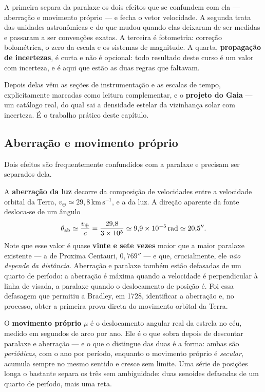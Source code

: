 \documentclass[11pt,a4paper]{article}
\begin{document}
A primeira separa da paralaxe os dois efeitos que se confundem com ela --- aberração e movimento próprio --- e fecha o vetor velocidade. A segunda trata das unidades astronômicas e do que mudou quando elas deixaram de ser medidas e passaram a ser convenções exatas. A terceira é fotometria: correção bolométrica, o zero da escala e os sistemas de magnitude. A quarta, \textbf{propagação de incertezas}, é curta e não é opcional: todo resultado deste curso é um valor com incerteza, e é aqui que estão as duas regras que faltavam.

Depois delas vêm as seções de instrumentação e as escalas de tempo, explicitamente marcadas como leitura complementar, e o \textbf{projeto do Gaia} --- um catálogo real, do qual sai a densidade estelar da vizinhança solar com incerteza. É o trabalho prático deste capítulo.

\subsection*{Aberração e movimento próprio}

Dois efeitos são frequentemente confundidos com a paralaxe e precisam ser separados dela.

A \textbf{aberração da luz} decorre da composição de velocidades entre a velocidade orbital da Terra, $v_\oplus\simeq29{,}8\,\mathrm{km\,s^{-1}}$, e a da luz. A direção aparente da fonte desloca-se de um ângulo
\[
\theta_{\rm ab}\simeq\frac{v_\oplus}{c}=\frac{29{,}8}{3\times10^{5}}\simeq9{,}9\times10^{-5}\,\mathrm{rad}\simeq20{,}5''.
\]
Note que esse valor é quase \textbf{vinte e sete vezes} maior que a maior paralaxe existente --- a de Proxima Centauri, $0{,}769''$ --- e que, crucialmente, ele \emph{não depende da distância}. Aberração e paralaxe também estão defasadas de um quarto de período: a aberração é máxima quando a velocidade é perpendicular à linha de visada, a paralaxe quando o deslocamento de posição é. Foi essa defasagem que permitiu a Bradley, em 1728, identificar a aberração e, no processo, obter a primeira prova direta do movimento orbital da Terra.

O \textbf{movimento próprio} $\mu$ é o deslocamento angular real da estrela no céu, medido em segundos de arco por ano. Ele é o que sobra depois de descontar paralaxe e aberração --- e o que o distingue das duas é a forma: ambas são \emph{periódicas}, com o ano por período, enquanto o movimento próprio é \emph{secular}, acumula sempre no mesmo sentido e cresce sem limite. Uma série de posições longa o bastante separa os três sem ambiguidade: duas senoides defasadas de um quarto de período, mais uma reta.
\end{document}
